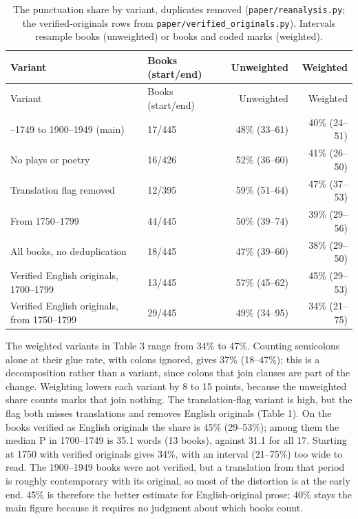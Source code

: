 \documentclass[
  11pt,
]{article}
\begin{document}
\begin{longtable}[]{@{}llrr@{}}
\caption{The punctuation share by variant, duplicates removed (\protect\texttt{paper/reanalysis.py}; the verified-originals rows from \protect\texttt{paper/verified\_originals.py}). Intervals resample
books (unweighted) or books and coded marks (weighted).}\tabularnewline
\toprule\noalign{}
Variant & Books (start/end) & Unweighted & Weighted \\
\midrule\noalign{}
\endfirsthead
\toprule\noalign{}
Variant & Books (start/end) & Unweighted & Weighted \\
\midrule\noalign{}
\endhead
\bottomrule\noalign{}
\endlastfoot
1700--1749 to 1900--1949 (main) & 17/445 & 48\% (33--61) & 40\% (24--51) \\
No plays or poetry & 16/426 & 52\% (36--60) & 41\% (26--50) \\
Translation flag removed & 12/395 & 59\% (51--64) & 47\% (37--53) \\
From 1750--1799 & 44/445 & 50\% (39--74) & 39\% (29--56) \\
All books, no deduplication & 18/445 & 47\% (39--60) & 38\% (29--50) \\
Verified English originals, 1700--1799 & 13/445 & 57\% (45--62) & 45\% (29--53) \\
Verified English originals, from 1750--1799 & 29/445 & 49\% (34--95) & 34\% (21--75) \\
\end{longtable}

The weighted variants in Table 3 range from 34\% to 47\%. Counting semicolons alone at their glue rate, with colons ignored, gives 37\% (18--47\%); this is a decomposition rather than a variant, since
colons that join clauses are part of the change. Weighting lowers each variant by 8 to 15 points, because the unweighted share counts marks that join nothing. The translation-flag variant is high, but
the flag both misses translations and removes English originals (Table 1). On the books verified as English originals the share is 45\% (29--53\%); among them the median P in 1700--1749 is 35.1 words
(13 books), against 31.1 for all 17. Starting at 1750 with verified originals gives 34\%, with an interval (21--75\%) too wide to read. The 1900--1949 books were not verified, but a translation from
that period is roughly contemporary with its original, so most of the distortion is at the early end. 45\% is therefore the better estimate for English-original prose; 40\% stays the main figure
because it requires no judgment about which books count.
\end{document}
